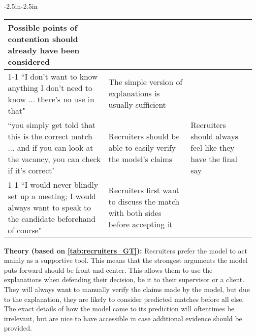 \begin{table*}[]
\begin{adjustwidth}{-2.5in}{-2.5in}
\begin{tabularx}{1.5\textwidth}{@{}X>{\raggedright\arraybackslash}p{6.5cm}>{\raggedright\arraybackslash}p{3.5cm}@{}}
  Possible points of contention should already have been considered &
   \\ \cmidrule(r){1-1}
``I don't want to know anything I don't need to know ... there's no use in that" &
  The simple version of explanations is usually sufficient &
   \\ \midrule
``you simply get told that this is the correct match ... and if you can look at the vacancy, you can check if it's correct" &
  Recruiters should be able to easily verify the model's claims &
  Recruiters should always feel like they have the final say \\ \cmidrule(r){1-1}
``I would never blindly set up a meeting; I would always want to speak to the candidate beforehand of course" &
  Recruiters first want to discuss the match with both sides before accepting it &
   \\ \bottomrule
   
\end{tabularx}
\end{adjustwidth}
\caption{The quotes, open codes, and categories discovered by using grounded theory for the recruiters' responses.}
\label{tab:recruiters_GT}   
\end{table*}


\noindent \textbf{Theory (based on \cref{tab:recruiters_GT}):} Recruiters prefer the model to act mainly as a supportive tool. This means that the strongest arguments the model puts forward should be front and center. This allows them to use the explanations when defending their decision, be it to their supervisor or a client. They will always want to manually verify the claims made by the model, but due to the explanation, they are likely to consider predicted matches before all else. The exact details of how the model came to its prediction will oftentimes be irrelevant, but are nice to have accessible in case additional evidence should be provided. 

\newpage

